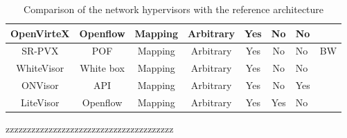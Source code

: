 \begin{table}[ht]
{\begin{tabular}{|c|c|c|c|c|c|l|c|}
OpenVirteX               & Openflow                  & Mapping       & Arbitrary     & Yes & No  & No       &                    \\ \hline
SR-PVX                   & POF                       & Mapping       & Arbitrary     & Yes & No  & No       & BW                 \\ \hline
WhiteVisor               & White box                 & Mapping       & Arbitrary     & Yes & No  & No       &                    \\ \hline
ONVisor                  & API                       & Mapping       & Arbitrary     & Yes & No  & Yes      &                    \\ \hline
LiteVisor                & Openflow                  & Mapping       & Arbitrary     & Yes & Yes & No       &                    \\ \hline
\end{tabular}%
zzzzzzzzzzzzzzzzzzzzzzzzzzzzzzzzzzzzzzz
}
\caption{Comparison of the network hypervisors with the reference architecture}
\label{tab:comparison-refarchi}
\end{table}